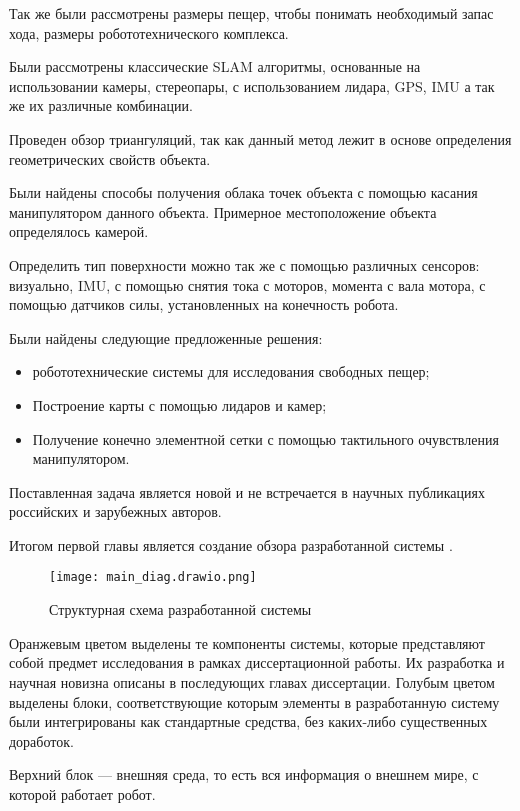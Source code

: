 Так же были рассмотрены размеры пещер, чтобы понимать необходимый запас хода, размеры робототехнического комплекса.

Были рассмотрены классические SLAM алгоритмы, основанные на использовании камеры, стереопары, с использованием лидара, GPS, IMU а так же их различные комбинации. 

Проведен обзор триангуляций, так как данный метод лежит в основе определения геометрических свойств объекта.

Были найдены способы получения облака точек объекта с помощью касания манипулятором данного объекта. Примерное местоположение объекта определялось камерой.

Определить тип поверхности можно так же с помощью различных сенсоров: визуально, IMU, с помощью снятия тока с моторов, момента с вала мотора, с помощью датчиков силы, установленных на конечность робота.

Были найдены следующие предложенные решения:
\begin{itemize}
    \item робототехнические системы для исследования свободных пещер;
    \item Построение карты с помощью лидаров и камер;
    \item Получение конечно элементной сетки с помощью тактильного очувствления манипулятором.
\end{itemize}

Поставленная задача является новой и не встречается в научных публикациях российских и зарубежных авторов.

Итогом первой главы является создание обзора разработанной системы .
\begin{figure}[H]
    \centering\texttt{[image: main\_diag.drawio.png]}
    \caption{Структурная схема разработанной системы}
    \label{fig:diag_system.png}
\end{figure}

Оранжевым цветом выделены те компоненты системы, которые представляют собой предмет исследования в рамках диссертационной работы. Их разработка и научная новизна описаны в последующих главах диссертации. Голубым цветом выделены блоки, соответствующие которым элементы в разработанную систему были интегрированы как стандартные средства,   без каких-либо существенных доработок.

Верхний блок --- внешняя среда, то есть вся информация о внешнем мире, с которой работает робот.


